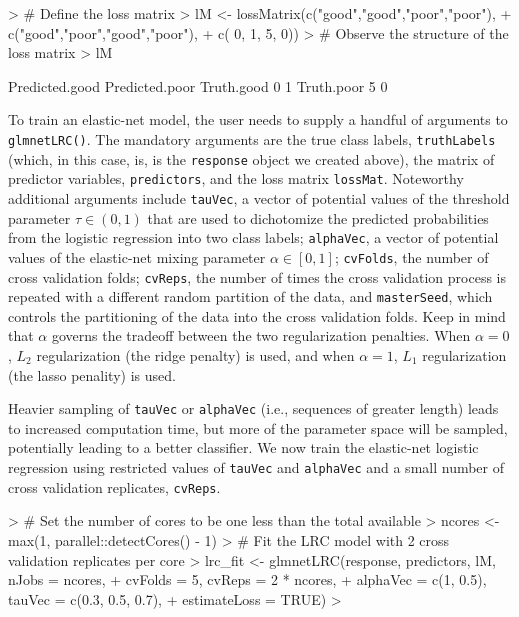 \documentclass{article}
\begin{document}
\begin{Schunk}
\begin{Sinput}
> # Define the loss matrix
> lM <- lossMatrix(c("good","good","poor","poor"),
+                  c("good","poor","good","poor"),
+                  c(     0,     1,     5,     0))
> # Observe the structure of the loss matrix
> lM
\end{Sinput}
\begin{Soutput}
           Predicted.good Predicted.poor
Truth.good              0              1
Truth.poor              5              0
\end{Soutput}
\end{Schunk}

To train an elastic-net model, the user needs to supply a handful of arguments to {\tt glmnetLRC()}. 
The mandatory arguments are the true class labels, {\tt truthLabels} (which, in this case, is, is the {\tt response} 
object we created above), the matrix of predictor variables, {\tt predictors}, 
and the loss matrix {\tt lossMat}. Noteworthy additional arguments include {\tt tauVec}, a vector of potential values of the 
threshold parameter $\tau \in (0, 1)$ that are used to dichotomize the predicted probabilities from the logistic regression 
into two class labels; {\tt alphaVec}, a vector of potential values of the elastic-net mixing parameter 
$\alpha \in [0, 1]$; {\tt cvFolds}, the number of cross validation folds; {\tt cvReps}, the number of times
the cross validation process is repeated with a different random partition of the data, and {\tt masterSeed}, which controls 
the partitioning of the data into the cross validation folds. Keep in mind that $\alpha$ governs the tradeoff between 
the two regularization penalties. When $\alpha = 0$, $L_2$ regularization (the ridge penalty) is used,
and when $\alpha = 1$, $L_1$ regularization (the lasso penality) is used.

Heavier sampling of {\tt tauVec} or {\tt alphaVec} (i.e., sequences of greater length) leads to 
increased computation time, but more of the parameter space will be sampled, potentially leading to a better 
classifier.  We now train the elastic-net logistic regression using restricted values of {\tt tauVec} and 
{\tt alphaVec} and a small number of cross validation replicates, {\tt cvReps}.
\begin{Schunk}
\begin{Sinput}
> # Set the number of cores to be one less than the total available
> ncores <- max(1, parallel::detectCores() - 1)
> # Fit the LRC model with 2 cross validation replicates per core
> lrc_fit <- glmnetLRC(response, predictors, lM, nJobs = ncores,
+                      cvFolds = 5, cvReps = 2 * ncores,
+                      alphaVec = c(1, 0.5), tauVec = c(0.3, 0.5, 0.7),
+                      estimateLoss = TRUE)
> 
\end{Sinput}
\end{Schunk}
\end{document}
